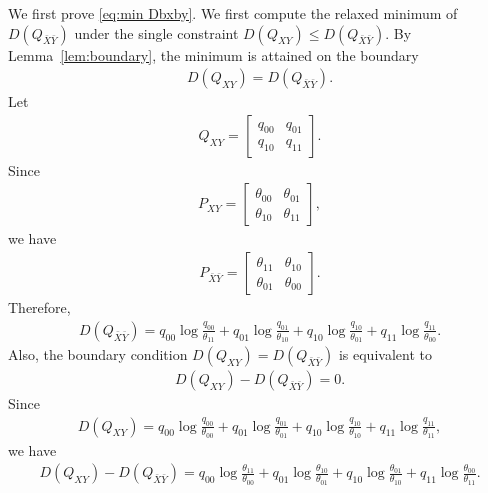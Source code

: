 \documentclass[journal,onecolumn]{IEEEtran}
\theoremstyle{definition}
\theoremstyle{remark}
\newcommand{\Dxy}{D({Q_{XY}})}
\newcommand{\Dbxby}{D({Q_{\bar{X}\bar{Y}}})}
\newcommand{\Qxy}{Q_{XY}}
\newcommand{\Pxy}{P_{XY}}
\newcommand{\Pbxby}{P_{\bar{X}\bar{Y}}}
\begin{document}
    We first prove \eqref{eq:min Dbxby}.
    We first compute the relaxed minimum of $\Dbxby$ under the single constraint $\Dxy\leq\Dbxby$.
    By Lemma~\ref{lem:boundary}, the minimum is attained on the boundary
    \begin{align*}
        \Dxy=\Dbxby.
    \end{align*}
    Let
    \begin{align*}
        \Qxy
        =
        \begin{bmatrix}
            q_{00} & q_{01}\\
            q_{10} & q_{11}
        \end{bmatrix}.
    \end{align*}
    Since
    \begin{align*}
        \Pxy
        =
        \begin{bmatrix}
            \theta_{00} & \theta_{01}\\
            \theta_{10} & \theta_{11}
        \end{bmatrix},
    \end{align*}
    we have
    \begin{align*}
        \Pbxby
        =
        \begin{bmatrix}
            \theta_{11} & \theta_{10}\\
            \theta_{01} & \theta_{00}
        \end{bmatrix}.
    \end{align*}
    Therefore,
    \begin{align*}
        \Dbxby
        =
        q_{00}\log\frac{q_{00}}{\theta_{11}}
        +
        q_{01}\log\frac{q_{01}}{\theta_{10}}
        +
        q_{10}\log\frac{q_{10}}{\theta_{01}}
        +
        q_{11}\log\frac{q_{11}}{\theta_{00}}.
    \end{align*}
    Also, the boundary condition $\Dxy=\Dbxby$ is equivalent to
    \begin{align*}
        \Dxy-\Dbxby=0.
    \end{align*}
    Since
    \begin{align*}
        \Dxy
        =
        q_{00}\log\frac{q_{00}}{\theta_{00}}
        +
        q_{01}\log\frac{q_{01}}{\theta_{01}}
        +
        q_{10}\log\frac{q_{10}}{\theta_{10}}
        +
        q_{11}\log\frac{q_{11}}{\theta_{11}},
    \end{align*}
    we have
    \begin{align*}
        \Dxy-\Dbxby
        =
        q_{00}\log\frac{\theta_{11}}{\theta_{00}}
        +
        q_{01}\log\frac{\theta_{10}}{\theta_{01}}
        +
        q_{10}\log\frac{\theta_{01}}{\theta_{10}}
        +
        q_{11}\log\frac{\theta_{00}}{\theta_{11}}.
    \end{align*}
\end{document}
